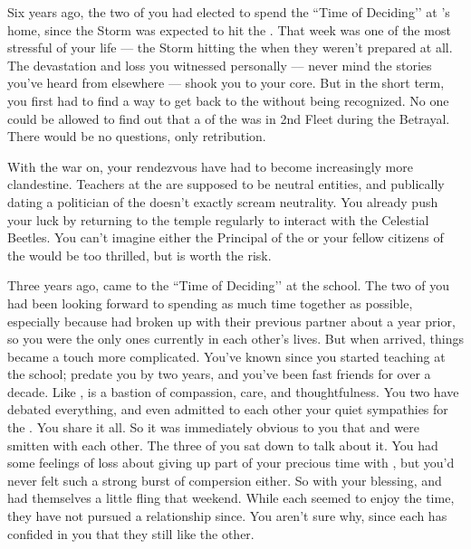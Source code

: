 \documentclass[char]{GL2020}
\begin{document}
Six years ago, the two of you had elected to spend the ``Time of Deciding’’ at \cJuniorStatesman{}’s home, since the Storm was expected to hit the \pTech{}. That week was one of the most stressful of your life — the Storm hitting the \pShip{} when they weren’t prepared at all. The devastation and loss you witnessed personally — never mind the stories you’ve heard from elsewhere — shook you to your core. But in the short term, you first had to find a way to get back to the \pSchool{} without being recognized. No one could be allowed to find out that a \cBeetle{\cleric} of the \pTech{} was in 2nd Fleet during the Betrayal. There would be no questions, only retribution.

With the war on, your rendezvous have had to become increasingly more clandestine. Teachers at the \pSchool{} are supposed to be neutral entities, and publically dating a politician of the \pShip{} doesn’t exactly scream neutrality. You already push your luck by returning to the temple regularly to interact with the Celestial Beetles. You can’t imagine either the Principal of the \pSc{} or your fellow citizens of the \pTech{} would be too thrilled, but \cJuniorStatesman{} is worth the risk. 

Three years ago, \cJuniorStatesman{} came to the ``Time of Deciding’’ at the school. The two of you had been looking forward to spending as much time together as possible, especially because \cJuniorStatesman{} had broken up with their previous partner about a year prior, so you were the only ones currently in each other’s lives. But when \cJuniorStatesman{\they} arrived, things became a touch more complicated. You’ve known \cEthics{} since you started teaching at the school; \cEthics{\they} predate\cEthics{\verbs} you by two years, and you’ve been fast friends for over a decade. Like \cMusic{}, \cEthics{} is a bastion of compassion, care, and thoughtfulness. You two have debated everything, and even admitted to each other your quiet sympathies for the \pShippies{}. You share it all. So it was immediately obvious to you that \cJuniorStatesman{} and \cEthics{} were smitten with each other. The three of you sat down to talk about it. You had some feelings of loss about giving up part of your precious time with \cJuniorStatesman{}, but you’d never felt such a strong burst of compersion either. So with your blessing, \cJuniorStatesman{} and \cBeetle{} had themselves a little fling that weekend. While each seemed to enjoy the time, they have not pursued a relationship since. You aren’t sure why, since each has confided in you that they still like the other.
\end{document}
